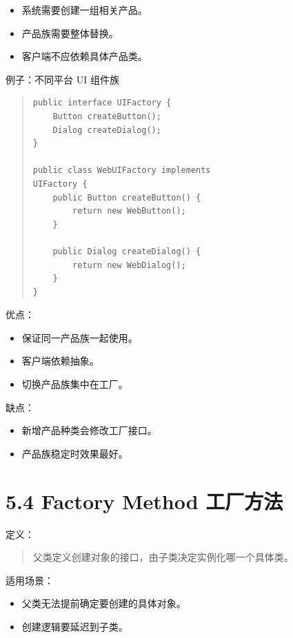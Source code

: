 \documentclass[UTF8,zihao=-4]{ctexart}
\begin{document}
\begin{itemize}
\item 系统需要创建一组相关产品。
\item 产品族需要整体替换。
\item 客户端不应依赖具体产品类。
\end{itemize}

例子：不同平台 UI 组件族

\begin{quote}
\footnotesize
\begin{verbatim}
public interface UIFactory {
    Button createButton();
    Dialog createDialog();
}

public class WebUIFactory implements 
UIFactory {
    public Button createButton() {
        return new WebButton();
    }

    public Dialog createDialog() {
        return new WebDialog();
    }
}
\end{verbatim}
\end{quote}

优点：

\begin{itemize}
\item 保证同一产品族一起使用。
\item 客户端依赖抽象。
\item 切换产品族集中在工厂。
\end{itemize}

缺点：

\begin{itemize}
\item 新增产品种类会修改工厂接口。
\item 产品族稳定时效果最好。
\end{itemize}

\section{5.4 Factory Method 工厂方法}

定义：

\begin{quote}
父类定义创建对象的接口，由子类决定实例化哪一个具体类。
\end{quote}

适用场景：

\begin{itemize}
\item 父类无法提前确定要创建的具体对象。
\item 创建逻辑要延迟到子类。
\end{itemize}
\end{document}
